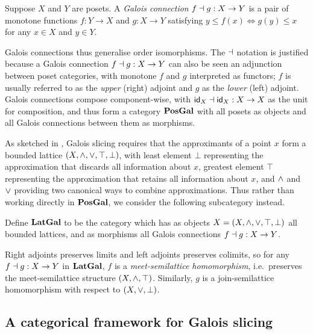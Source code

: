 \begin{definition}
Suppose $X$ and $Y$ are posets. A \emph{Galois connection} $f \dashv g: X \to Y$ is a pair of monotone functions
$f: Y \to X$ and $g: X \to Y$ satisfying $y \leq f(x) \iff g(y) \leq x$ for any $x \in X$ and $y \in Y$.
\end{definition}

\noindent Galois connections thus generalise order isomorphisms. The $\dashv$ notation is justified because a
Galois connection $f \dashv g: X \to Y$ can also be seen an adjunction between poset categories, with monotone
$f$ and $g$ interpreted as functors; $f$ is usually referred to as the \emph{upper} (right) adjoint and $g$ as
the \emph{lower} (left) adjoint. Galois connections compose component-wise, with $\mathsf{id}_X \dashv \mathsf{id}_X: X \to X$
as the unit for composition, and thus form a category $\mathbf{PosGal}$ with all posets as objects and all Galois
connections between them as morphisms.

As sketched in , Galois slicing requires that the approximants of a point
$x$ form a bounded lattice $(X, \wedge, \vee, \top, \bot)$, with least element $\bot$ representing the
approximation that discards all information about $x$, greatest element $\top$ representing the approximation
that retains all information about $x$, and $\wedge$ and $\vee$ providing two canonical ways to combine
approximations. Thus rather than working directly in $\mathbf{PosGal}$, we consider the following subcategory instead.

\begin{definition}
Define $\mathbf{LatGal}$ to be the category which has as objects $X = (X, \wedge, \vee, \top, \bot)$ all bounded
lattices, and as morphisms all Galois connections $f \dashv g: X \to Y$.
\end{definition}

\noindent Right adjoints preserves limits and left adjoints preserves colimits, so for any $f \dashv g: X \to Y$
in $\mathbf{LatGal}$, $f$ is a \emph{meet-semilattice homomorphism}, i.e.~preserves the meet-semilattice structure
$(X, \wedge, \top)$. Similarly, $g$ is a join-semilattice homomorphism with respect to $(X, \vee, \bot)$.

\subsection{A categorical framework for Galois slicing}

